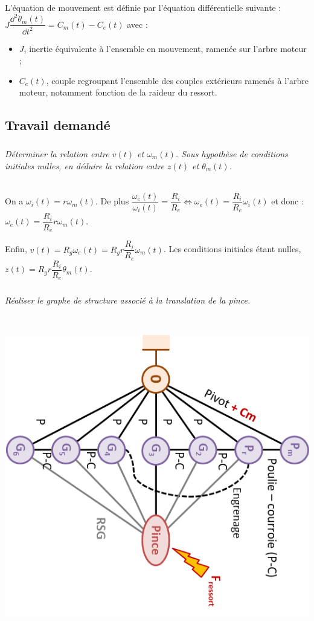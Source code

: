 \documentclass[10pt,fleqn]{article} %
\begin{document}
\begin{multicols}{2}
L’équation de mouvement est définie par l’équation différentielle suivante : $J\dfrac{\dd^2 \theta_m(t)}{\dd t^2}=C_m(t)-C_e(t)$  avec :
\begin{itemize}
\item $J$, inertie équivalente à l’ensemble en mouvement, ramenée sur l’arbre moteur ;
\item $C_e(t)$, couple regroupant l’ensemble des couples extérieurs ramenés à l’arbre moteur, notamment fonction de la raideur du ressort.
\end{itemize}

\fi


\subsection*{Travail demandé}


\subparagraph{}\textit{Déterminer la relation entre $v(t)$ et $\omega_m(t)$. Sous hypothèse de conditions initiales nulles, en déduire la relation entre $z(t)$ et $\theta_m(t)$.}
\ifprof
\begin{corrige} ~\\
On a $\omega_i(t) = r\omega_m(t)$. De plus $\dfrac{\omega_e(t)}{\omega_i(t)}=\dfrac{R_i}{R_e} \Longleftrightarrow \omega_e(t)=\dfrac{R_i}{R_e}\omega_i(t)$ et donc :
$\omega_e(t)=\dfrac{R_i}{R_e}r\omega_m(t)$.

Enfin, $v(t)=R_g \omega_e(t) =R_g r \dfrac{R_i}{R_e}\omega_m(t)$. Les conditions initiales étant nulles, $z(t)=R_g r \dfrac{R_i}{R_e}\theta_m(t)$. 
\end{corrige}
\else
\fi


\subparagraph{}\textit{Réaliser le graphe de structure associé à la translation de la pince.}
\ifprof
\begin{corrige} ~\\
\begin{center}
\includegraphics[width=.6\linewidth]{images/fig_07}
\end{center}


\end{corrige}
\end{multicols}
\end{document}
